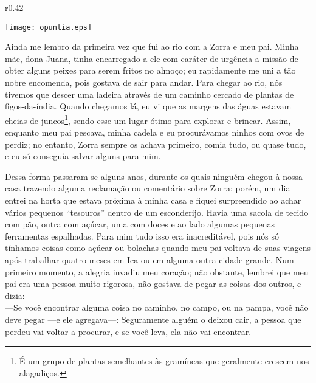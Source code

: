 \ifdefined\EnableIncludeImages
\begin{wrapfigure}{r}{0.42\textwidth}
  \begin{center}
  \vspace{-30pt}
    \texttt{[image: opuntia.eps]}
  \end{center}
  \vspace{-20pt}
\end{wrapfigure}
\fi
Ainda me lembro da primeira vez que fui ao rio com a Zorra e meu pai. 
Minha mãe, dona Juana, tinha encarregado a ele com caráter de urgência a missão de obter alguns peixes para serem fritos no almoço; eu rapidamente me uni a tão nobre encomenda, pois gostava de sair para andar. 
Para chegar ao rio, nós tivemos que descer uma ladeira através de um caminho cercado de plantas de figos-da-índia. 
Quando chegamos lá, eu vi que as margens das águas estavam cheias de juncos\footnote{É um grupo de plantas semelhantes às gramíneas que geralmente crescem nos alagadiços.}, sendo esse um lugar ótimo para explorar e brincar. 
Assim, enquanto meu pai pescava, minha cadela e eu procurávamos ninhos com ovos de perdiz; 
no entanto, Zorra sempre os achava primeiro, comia tudo, ou quase tudo, e eu só conseguía salvar alguns para mim.

Dessa forma passaram-se alguns anos, durante os quais ninguém chegou à nossa casa trazendo alguma reclamação ou comentário sobre Zorra; 
porém, um dia entrei na horta que estava próxima à minha casa e fiquei surpreendido ao achar vários pequenos ``tesouros'' dentro de um esconderijo. 
Havia uma sacola de tecido com pão, outra com açúcar, uma com doces e ao lado algumas pequenas ferramentas espalhadas. 
Para mim tudo isso era inacreditável, pois nós só tínhamos coisas como açúcar ou bolachas quando meu pai voltava de suas viagens após trabalhar quatro meses em Ica ou em alguma outra cidade grande.
Num primeiro momento, a alegria invadiu meu coração; não obstante, lembrei que meu pai era uma pessoa muito rigorosa, não gostava de pegar as coisas dos outros, e dizia:\\\indent
---Se você encontrar alguma coisa no caminho, no campo, ou na pampa, você não deve pegar ---e ele agregava---: 
Seguramente alguém o deixou cair, a pessoa que perdeu vai voltar a procurar, e se você leva, ela não vai encontrar.

